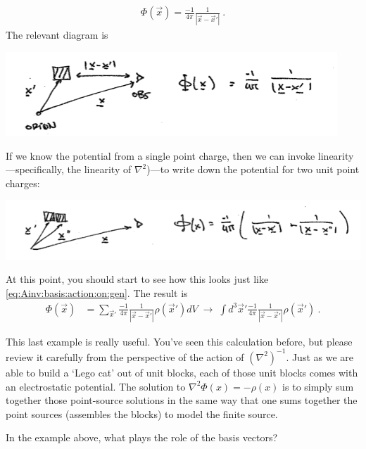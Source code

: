 \begin{example}
\begin{align}
  \Phi(\vec{x}) = \frac{-1}{4\pi} \frac{1}{|\vec{x}-\vec{x}'|} \ .
\end{align}
The relevant diagram is
\begin{center}
\includegraphics[width=.5\textwidth]{figures/lec06_1charge.png}
\end{center}
If we know the potential from a single point charge, then we can invoke linearity---specifically, the linearity of $\nabla^2$)---to write down the potential for two unit point charges: 
\begin{center}
\includegraphics[width=.7\textwidth]{figures/lec06_2charge.png}
\end{center}
At this point, you should start to see how this looks just like \eqref{eq:Ainv:basis:action:on:gen}. The result is
\begin{align}
  \Phi(\vec{x}) &= 
  \sum_{\vec{x}'} \frac{-1}{4\pi} \frac{1}{|\vec{x}-\vec{x}'|} \rho(\vec{x}') dV
  \;\to \;
 \int d^3\vec{x}' \frac{-1}{4\pi} \frac{1}{|\vec{x}-\vec{x}'|} \rho(\vec{x}')   \ .
 \label{eq:electrostatics:greens:func}
\end{align}
\end{example}
This last example is really useful. You've seen this calculation before, but please review it carefully from the perspective of the action of $(\nabla^2)^{-1}$. Just as we are able to build a `Lego cat' out of unit blocks, each of those unit blocks comes with an electrostatic potential. The solution to $\nabla^2 \Phi(x) = -\rho(x)$ is to simply sum together those point-source solutions in the same way that one sums together the point sources (assembles the blocks) to model the finite source.

\begin{exercise}
In the example above, what plays the role of the basis vectors? 
\end{exercise}

